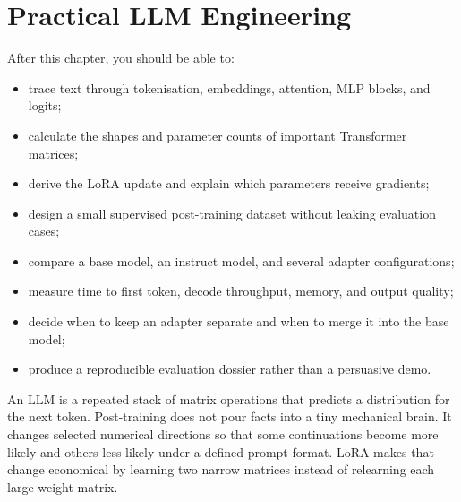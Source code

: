 
\chapter{Practical LLM Engineering}

\label{ch:practical-llm-engineering}

\begin{learningobjectives}
After this chapter, you should be able to:
\begin{itemize}
    \item trace text through tokenisation, embeddings, attention, MLP blocks,
          and logits;
    \item calculate the shapes and parameter counts of important Transformer
          matrices;
    \item derive the LoRA update and explain which parameters receive gradients;
    \item design a small supervised post-training dataset without leaking
          evaluation cases;
    \item compare a base model, an instruct model, and several adapter
          configurations;
    \item measure time to first token, decode throughput, memory, and output
          quality;
    \item decide when to keep an adapter separate and when to merge it into the
          base model;
    \item produce a reproducible evaluation dossier rather than a persuasive
          demo.
\end{itemize}
\end{learningobjectives}

\begin{plainlanguage}
An LLM is a repeated stack of matrix operations that predicts a distribution
for the next token.
Post-training does not pour facts into a tiny mechanical brain.
It changes selected numerical directions so that some continuations become
more likely and others less likely under a defined prompt format.
LoRA makes that change economical by learning two narrow matrices instead of
relearning each large weight matrix.
\end{plainlanguage}

